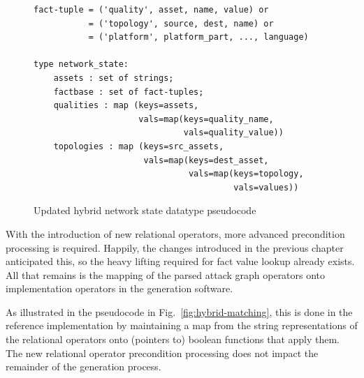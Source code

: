 \begin{figure}
\begin{lstlisting}
fact-tuple = ('quality', asset, name, value) or
           = ('topology', source, dest, name) or
           = ('platform', platform_part, ..., language)

type network_state:
    assets : set of strings;
    factbase : set of fact-tuples;
    qualities : map (keys=assets, 
                     vals=map(keys=quality_name,
                              vals=quality_value))
    topologies : map (keys=src_assets, 
                      vals=map(keys=dest_asset,
                               vals=map(keys=topology,
                                        vals=values))
\end{lstlisting}
\caption{Updated hybrid network state datatype pseudocode}
\label{fig:netstate_map_hybrid_pc}
\end{figure}
With the introduction of new relational operators, more advanced
precondition processing is required. Happily, the changes introduced
in the previous chapter anticipated this, so the heavy lifting required for
fact value lookup already exists. All that remains is the mapping of the
parsed attack graph operators onto implementation operators in the generation
software.

As illustrated in the pseudocode in Fig.~\ref{fig:hybrid-matching}, this is
done in the reference implementation by maintaining a map from the string
representations of the relational operators onto (pointers to) boolean 
functions that apply
them. The new relational operator precondition processing does not impact the
remainder of the generation process.

